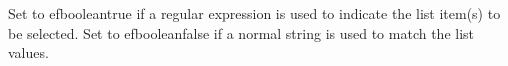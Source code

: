     Set to \jb{}efbooleantrue if a regular expression is used to
  indicate the list item(s) to be selected. Set to \jb{}efbooleanfalse
  if a normal string is used to match the list values.
